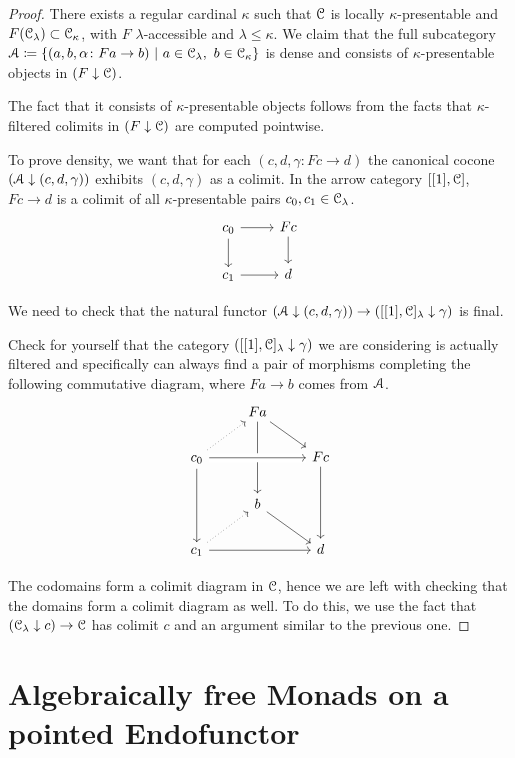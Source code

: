 \documentclass[a4paper,11pt,oneside,openany]{scrbook}
\begin{document}
\begin{proof}
    There exists a regular cardinal $\kappa$ such that $\operatorname{\mathcal{C}}$ is locally $\kappa$-presentable and $F(\operatorname{\mathcal{C}}_\lambda)\subset\operatorname{\mathcal{C}}_\kappa$, with $F$ $\lambda$-accessible and $\lambda\leq\kappa$. We claim that the full subcategory $\A\coloneqq\{(a,b,\alpha\colon Fa\rightarrow b)\ |\ a\in\C_\lambda,\ b\in\C_\kappa\}$ is dense and consists of $\kappa$-presentable objects in $(F\downarrow\operatorname{\mathcal{C}})$.
    
    The fact that it consists of $\kappa$-presentable objects follows from the facts that $\kappa$-filtered colimits in $(F\downarrow\operatorname{\mathcal{C}})$ are computed pointwise.
    
    To prove density, we want that for each $(c,d,\gamma\colon Fc\rightarrow d)$ the canonical cocone $(\operatorname{\mathcal{A}}\downarrow (c,d,\gamma))$ exhibits $(c,d,\gamma)$ as a colimit. In the arrow category $[[1],\operatorname{\mathcal{C}}]$, $Fc\rightarrow d$ is a colimit of all $\kappa$-presentable pairs $c_0,c_1\in\operatorname{\mathcal{C}}_\lambda$.
    \[
    \begin{tikzcd}
        c_0\ar[d]\ar[r]
        & Fc\ar[d] \\
        c_1\ar[r]
        & d
    \end{tikzcd}
    \]
    
    We need to check that the natural functor $(\operatorname{\mathcal{A}}\downarrow (c,d,\gamma))\rightarrow ([[1],\operatorname{\mathcal{C}}]_\lambda\downarrow\gamma)$ is final.
    
    Check for yourself that the category $([[1],\operatorname{\mathcal{C}}]_\lambda\downarrow\gamma)$ we are considering is actually filtered and specifically can always find a pair of morphisms completing the following commutative diagram, where $Fa\rightarrow b$ comes from $\operatorname{\mathcal{A}}$.
    \[
    \begin{tikzcd}
        & Fa\ar[dr]\ar[dd] \\
        c_0\ar[ur, dotted]\ar[rr, crossing over]\ar[dd]
        && Fc\ar[dd] \\
        & b\ar[dr] \\
        c_1\ar[ur, dotted]\ar[rr]
        && d
    \end{tikzcd}
    \]
    
    The codomains form a colimit diagram in $\operatorname{\mathcal{C}}$, hence we are left with checking that the domains form a colimit diagram as well. To do this, we use the fact that $(\operatorname{\mathcal{C}}_\lambda\downarrow c)\rightarrow\operatorname{\mathcal{C}}$ has colimit $c$ and an argument similar to the previous one.
\end{proof}

\section{Algebraically free Monads on a pointed Endofunctor}
\end{document}
